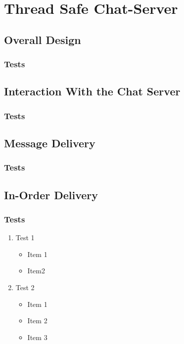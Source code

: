 \documentclass{article}
\begin{document}
\section*{Thread Safe Chat-Server}

\subsection{Overall Design}


\subsubsection{Tests}

\subsection{Interaction With the Chat Server}

\subsubsection{Tests}

\subsection{Message Delivery}

\subsubsection{Tests}

\subsection{In-Order Delivery}

\subsubsection{Tests}

\begin{enumerate}

\item Test 1
  \begin{itemize}
    \item Item 1
    \item Item2
  \end{itemize}

\item Test 2
  \begin{itemize}
    \item Item 1
    \item Item 2
    \item Item 3
  \end{itemize}
  
\end{enumerate}
\end{document}
